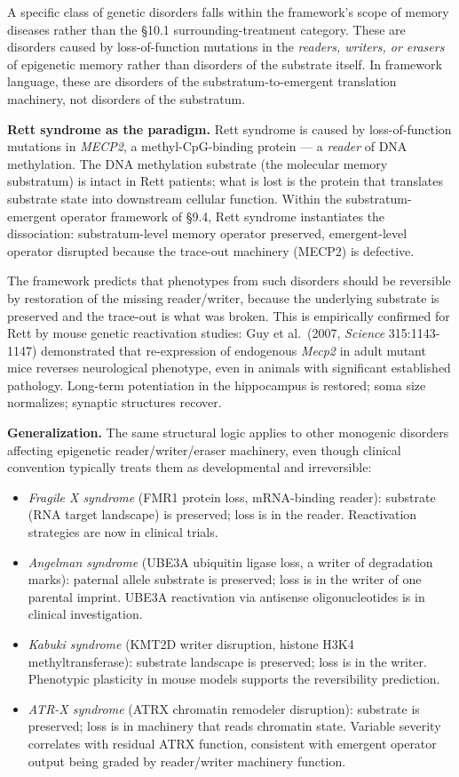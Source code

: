 \documentclass[
]{article}
\providecommand{\tightlist}{%
  \setlength{\itemsep}{0pt}\setlength{\parskip}{0pt}}
\begin{document}
A specific class of genetic disorders falls within the framework's scope
of memory diseases rather than the §10.1 surrounding-treatment category.
These are disorders caused by loss-of-function mutations in the
\emph{readers, writers, or erasers} of epigenetic memory rather than
disorders of the substrate itself. In framework language, these are
disorders of the substratum-to-emergent translation machinery, not
disorders of the substratum.

\textbf{Rett syndrome as the paradigm.} Rett syndrome is caused by
loss-of-function mutations in \emph{MECP2}, a methyl-CpG-binding protein
--- a \emph{reader} of DNA methylation. The DNA methylation substrate
(the molecular memory substratum) is intact in Rett patients; what is
lost is the protein that translates substrate state into downstream
cellular function. Within the substratum-emergent operator framework of
§9.4, Rett syndrome instantiates the dissociation: substratum-level
memory operator preserved, emergent-level operator disrupted because the
trace-out machinery (MECP2) is defective.

The framework predicts that phenotypes from such disorders should be
reversible by restoration of the missing reader/writer, because the
underlying substrate is preserved and the trace-out is what was broken.
This is empirically confirmed for Rett by mouse genetic reactivation
studies: Guy et al.~(2007, \emph{Science} 315:1143-1147) demonstrated
that re-expression of endogenous \emph{Mecp2} in adult mutant mice
reverses neurological phenotype, even in animals with significant
established pathology. Long-term potentiation in the hippocampus is
restored; soma size normalizes; synaptic structures recover.

\textbf{Generalization.} The same structural logic applies to other
monogenic disorders affecting epigenetic reader/writer/eraser machinery,
even though clinical convention typically treats them as developmental
and irreversible:

\begin{itemize}
\tightlist
\item
  \emph{Fragile X syndrome} (FMR1 protein loss, mRNA-binding reader):
  substrate (RNA target landscape) is preserved; loss is in the reader.
  Reactivation strategies are now in clinical trials.
\item
  \emph{Angelman syndrome} (UBE3A ubiquitin ligase loss, a writer of
  degradation marks): paternal allele substrate is preserved; loss is in
  the writer of one parental imprint. UBE3A reactivation via antisense
  oligonucleotides is in clinical investigation.
\item
  \emph{Kabuki syndrome} (KMT2D writer disruption, histone H3K4
  methyltransferase): substrate landscape is preserved; loss is in the
  writer. Phenotypic plasticity in mouse models supports the
  reversibility prediction.
\item
  \emph{ATR-X syndrome} (ATRX chromatin remodeler disruption): substrate
  is preserved; loss is in machinery that reads chromatin state.
  Variable severity correlates with residual ATRX function, consistent
  with emergent operator output being graded by reader/writer machinery
  function.
\end{itemize}
\end{document}
